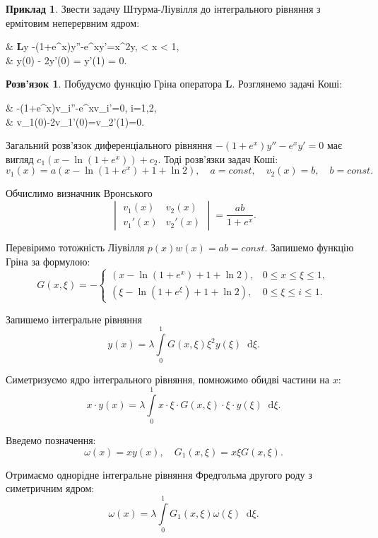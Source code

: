 \documentclass[a4paper, 12pt]{article}
\theoremstyle{definition}
\newtheorem*{example*}{Приклад}
\newtheorem*{solution*}{Розв'язок}
\newcommand{\Int}{\displaystyle\int\limits}
\newcommand*\diff{\mathop{}\!\mathrm{d}}
\renewcommand{\bf}[1]{\textbf{#1}}
\newenvironment{system*}{\begin{equation*} \left\{\begin{aligned}}{\end{aligned} \right. \end{equation*}}
\begin{document}
\begin{example*}
	Звести задачу Штурма-Ліувілля до інтегрального рівняння з ермітовим неперервним ядром:
	\begin{system*}
		& \bf{L}y \equiv -(1+e^x)y''-e^xy'=\lambda x^2y,  < x < 1, \\
		& y(0) - 2y'(0) = y'(1) = 0.
	\end{system*}
\end{example*}

\begin{solution*}
	Побудуємо функцію Гріна оператора $\bf{L}$. Розглянемо задачі Коші:
	\begin{system*}
		& -(1+e^x)v_i''-e^xv_i'=0, \quad i=1,2,\\
		& v_1(0)-2v_1'(0)=v_2'(1)=0.
	\end{system*}

	Загальний розв’язок диференціального рівняння $-(1+e^x)y''-e^xy'=0$ має вигляд $c_1(x-\ln(1+e^x))+c_2$. Тоді розв’язки задач Коші:
	\[ v_1(x) = a(x - \ln(1+e^x)+1+\ln2), \quad a = const, \quad v_2(x) = b, \quad b = const. \]

	Обчислимо визначник Вронського \[\begin{vmatrix} v_1(x) & v_2(x) \\ v_1'(x) & v_2'(x) \end{vmatrix} = \dfrac{ab}{1+e^x}. \]

	Перевіримо тотожність Ліувілля $p(x)w(x) = ab = const$. Запишемо функцію Гріна за формулою:
	\[ G(x, \xi) = - \begin{cases} (x-\ln(1+e^x)+1+\ln2), & 0\le x \le \xi \le 1, \\ (\xi-\ln(1+e^\xi)+1+\ln2), & 0\le \xi \le i \le 1. \end{cases} \]

	Запишемо інтегральне рівняння \[y(x) = \lambda \Int_0^1 G(x,\xi)\xi^2y(\xi)\diff\xi. \]

	Симетризуємо ядро інтегрального рівняння, помножимо обидві частини на $x$: \[ x \cdot y(x) = \lambda \Int_0^1 x \cdot \xi \cdot G(x, \xi) \cdot \xi \cdot y(\xi) \diff \xi. \]

	Введемо позначення: \[ \omega(x) = xy(x), \quad G_1(x, \xi) = x\xi G(x,\xi).\]

	Отримаємо однорідне інтегральне рівняння Фредгольма другого роду з симетричним ядром: \[\omega(x) = \lambda \Int_0^1 G_1(x, \xi) \omega(\xi) \diff \xi.\]
\end{solution*}

\newpage
\end{document}
